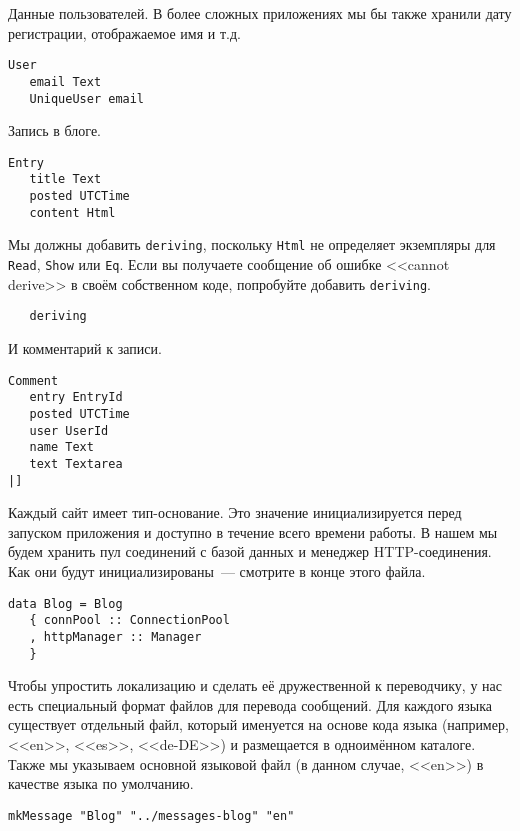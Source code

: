 Данные пользователей. В более сложных приложениях мы бы также хранили дату регистрации, отображаемое имя и т.д.

\begin{lstlisting}
User
   email Text
   UniqueUser email
\end{lstlisting}

Запись в блоге.

\begin{lstlisting}
Entry
   title Text
   posted UTCTime
   content Html
\end{lstlisting}

Мы должны добавить \lstinline!deriving!, поскольку \lstinline!Html! не определяет экземпляры для \lstinline!Read!, \lstinline!Show! или \lstinline!Eq!. Если вы получаете сообщение об ошибке <<cannot derive>> в своём собственном коде, попробуйте добавить \lstinline!deriving!.

\begin{lstlisting}
   deriving
\end{lstlisting}

И комментарий к записи.

\begin{lstlisting}
Comment
   entry EntryId
   posted UTCTime
   user UserId
   name Text
   text Textarea
|]
\end{lstlisting}

Каждый сайт имеет тип-основание. Это значение инициализируется перед запуском приложения и доступно в течение всего времени работы. В нашем мы будем хранить пул соединений с базой данных и менеджер HTTP-соединения. Как они будут инициализированы~--- смотрите в конце этого файла.

\begin{lstlisting}
data Blog = Blog
   { connPool :: ConnectionPool
   , httpManager :: Manager
   }
\end{lstlisting}

Чтобы упростить локализацию и сделать её дружественной к переводчику, у нас есть специальный формат файлов для перевода сообщений. Для каждого языка существует отдельный файл, который именуется на основе кода языка (например, <<en>>, <<es>>, <<de-DE>>) и размещается в одноимённом каталоге. Также мы указываем основной языковой файл (в данном случае, <<en>>) в качестве языка по умолчанию.

\begin{lstlisting}
mkMessage "Blog" "../messages-blog" "en"
\end{lstlisting}

